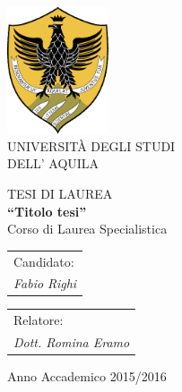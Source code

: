


\thispagestyle{empty}
\begin{center}

        \includegraphics[width=3cm]{images/logo}\\
\vspace{1cm}
       {\Huge UNIVERSIT\`A DEGLI STUDI}\\
        \vspace{8mm}                                                  %
        {\Huge DELL' AQUILA}\\
        \vspace{1.3cm}
        \vspace{2.2cm}

         {\Large TESI DI LAUREA} \\

        \vspace{8mm}
        {\LARGE \bfseries ``Titolo tesi''} \\
        \vspace{2.8cm}
        {\large Corso di Laurea Specialistica}\\
        \vspace{18mm}
    \end{center}
\vspace{20mm}
   \begin{tabular}{l}
        { Candidato:}\\
        { \textit{Fabio Righi}}\\
      \end{tabular}
    \hfill
    \begin{tabular}{l}
        { Relatore:}\\
        { \textit{Dott.  Romina Eramo}}\\
    \end{tabular}
\vspace{20mm}
\begin{center}
{\large Anno Accademico 2015/2016}
\end{center}
